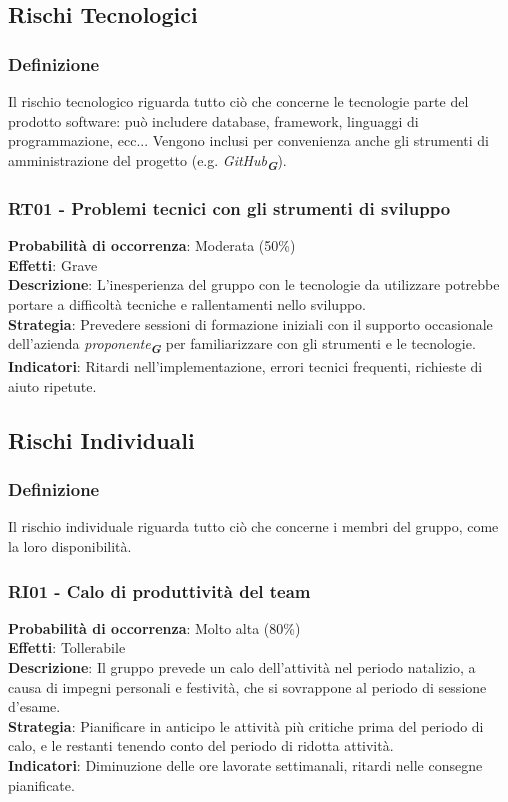 \documentclass[a4paper,12pt]{article}
\newcommand{\glossario}[1]{\textit{#1}\textsubscript{\textbf{\textit{\textcolor{lightblack}{G}}}}}
\begin{document}
\subsection{Rischi Tecnologici}

\subsubsection{Definizione}
Il rischio tecnologico riguarda tutto ciò che concerne le tecnologie parte del prodotto software: può includere database, framework, linguaggi di programmazione, ecc... Vengono inclusi per convenienza anche gli strumenti di amministrazione del progetto (e.g. \glossario{GitHub}).

\subsubsection{RT01 - Problemi tecnici con gli strumenti di sviluppo}
\label{RT01}
\textbf{Probabilità di occorrenza}: Moderata (50\%)\\
\textbf{Effetti}: Grave\\
\textbf{Descrizione}: L'inesperienza del gruppo con le tecnologie da utilizzare potrebbe portare a difficoltà tecniche e rallentamenti nello sviluppo.\\
\textbf{Strategia}: Prevedere sessioni di formazione iniziali con il supporto occasionale dell'azienda \glossario{proponente} per familiarizzare con gli strumenti e le tecnologie.\\
\textbf{Indicatori}: Ritardi nell'implementazione, errori tecnici frequenti, richieste di aiuto ripetute.




\subsection{Rischi Individuali}

\subsubsection{Definizione}
Il rischio individuale riguarda tutto ciò che concerne i membri del gruppo, come la loro disponibilità.

\subsubsection{RI01 - Calo di produttività del team}
\label{RI01}
\textbf{Probabilità di occorrenza}: Molto alta (80\%)\\
\textbf{Effetti}: Tollerabile\\
\textbf{Descrizione}: Il gruppo prevede un calo dell'attività nel periodo natalizio, a causa di impegni personali e festività, che si sovrappone al periodo di sessione d'esame.\\
\textbf{Strategia}: Pianificare in anticipo le attività più critiche prima del periodo di calo, e le restanti tenendo conto del periodo di ridotta attività.\\
\textbf{Indicatori}: Diminuzione delle ore lavorate settimanali, ritardi nelle consegne pianificate.
\end{document}

